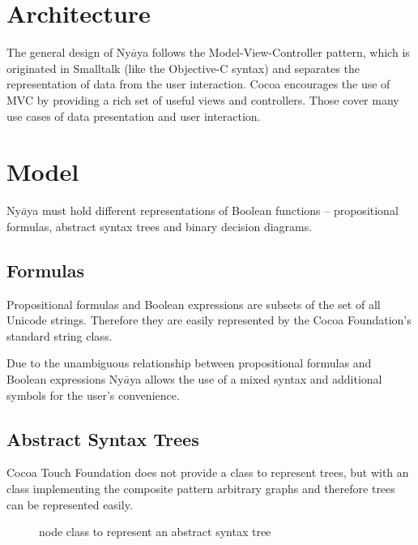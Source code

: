 
\section{Architecture}

The general design of Ny$\bar{a}$ya follows the Model-View-Controller pattern,
which is originated in Smalltalk \cite[p.4]{GAMMAETAL} (like the Objective-C syntax)
and separates the representation of data from the user interaction.
Cocoa  encourages the use of MVC by providing a rich set of useful views and controllers.
Those cover many use cases of data presentation and user interaction. 

\section{Model}

Ny$\bar{a}$ya must hold different representations of Boolean functions – propositional formulas, abstract syntax trees and binary decision diagrams. 

\subsection{Formulas}
Propositional formulas and Boolean expressions are subsets of the set of all Unicode strings. 
Therefore they are easily represented by the Cocoa Foundation's  
standard string class. 

Due to the unambiguous relationship between propositional formulas and Boolean expressions Ny$\bar{a}$ya allows the use of a mixed syntax and additional symbols for the user's convenience. 


\subsection{Abstract Syntax Trees}

Cocoa Touch Foundation does not provide a class to represent trees, 
but with an class implementing the composite pattern \cite[p.163ff]{GAMMAETAL}
arbitrary graphs and therefore trees can be represented easily.

\begin{figure}[htbp]
\begin{center}
\caption{node class to represent an abstract syntax tree}
\label{fig:NyayaNodeCluster}
\end{center}
\end{figure}

